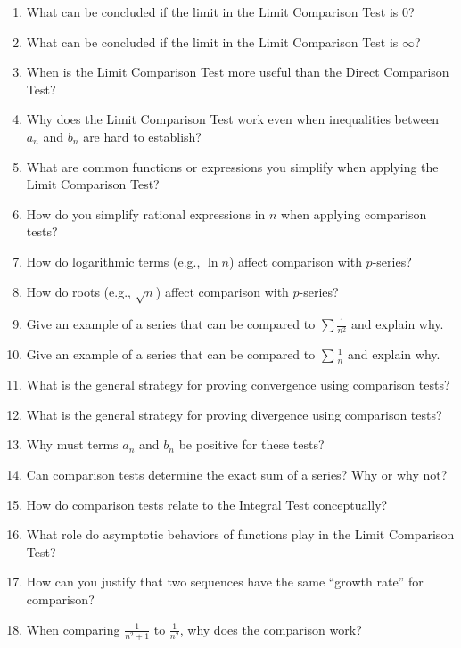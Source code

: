 \begin{enumerate}
\item What can be concluded if the limit in the Limit Comparison Test is $0$?

\item What can be concluded if the limit in the Limit Comparison Test is $\infty$?

\item When is the Limit Comparison Test more useful than the Direct Comparison Test?

\item Why does the Limit Comparison Test work even when inequalities between $a_n$ and $b_n$ are hard to establish?

\item What are common functions or expressions you simplify when applying the Limit Comparison Test?

\item How do you simplify rational expressions in $n$ when applying comparison tests?

\item How do logarithmic terms (e.g., $\ln n$) affect comparison with $p$-series?

\item How do roots (e.g., $\sqrt{n}$) affect comparison with $p$-series?

\item Give an example of a series that can be compared to $\sum \frac{1}{n^2}$ and explain why.

\item Give an example of a series that can be compared to $\sum \frac{1}{n}$ and explain why.

\item What is the general strategy for proving convergence using comparison tests?

\item What is the general strategy for proving divergence using comparison tests?

\item Why must terms $a_n$ and $b_n$ be positive for these tests?

\item Can comparison tests determine the exact sum of a series? Why or why not?

\item How do comparison tests relate to the Integral Test conceptually?

\item What role do asymptotic behaviors of functions play in the Limit Comparison Test?

\item How can you justify that two sequences have the same “growth rate” for comparison?

\item When comparing $\frac{1}{n^2+1}$ to $\frac{1}{n^2}$, why does the comparison work?

\end{enumerate}
